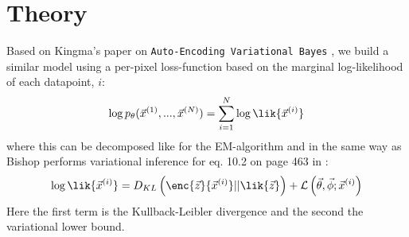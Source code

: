 \chapter{Theory}
\label{cha:theory}

Based on Kingma's paper on \texttt{Auto-Encoding Variational Bayes} \cite{Kingma2014}, we build a similar model using a per-pixel loss-function based on the marginal log-likelihood of each datapoint, $i$:
\begin{align}
	\log p_{\theta}(\vec{x}^{(1)}, ..., \vec{x}^{(N)}) = \sum^N_{i=1} \log \lik{\vec{x}^{(i)}} 
\end{align}
where this can be decomposed like for the EM-algorithm and in the same way as Bishop performs variational inference for eq. 10.2 on page 463 in \cite{Bishop2006}:
\begin{align}
	\log \lik{\vec{x}^{(i)}} = D_{KL}\left(\enc{\vec{z}}{\vec{x}^{(i)}}||\lik{\vec{z}}\right) + \mathcal{L}\left(\vec{\theta},\vec{\phi};\vec{x}^{(i)}\right)
\end{align} 
Here the first term is the Kullback-Leibler divergence and the second the variational lower bound.  